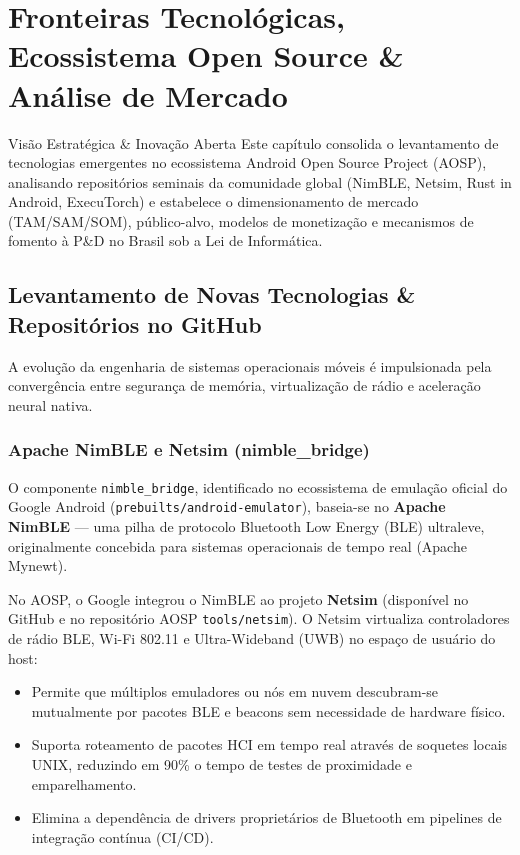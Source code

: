 \chapter{Fronteiras Tecnológicas, Ecossistema Open Source \& Análise de Mercado}
\label{chap:mercado_novas_tecnologias}

\begin{pedagogico}{Visão Estratégica \& Inovação Aberta}
Este capítulo consolida o levantamento de tecnologias emergentes no ecossistema Android Open Source Project (AOSP), analisando repositórios seminais da comunidade global (NimBLE, Netsim, Rust in Android, ExecuTorch) e estabelece o dimensionamento de mercado (TAM/SAM/SOM), público-alvo, modelos de monetização e mecanismos de fomento à P\&D no Brasil sob a Lei de Informática.
\end{pedagogico}

\section{Levantamento de Novas Tecnologias \& Repositórios no GitHub}

A evolução da engenharia de sistemas operacionais móveis é impulsionada pela convergência entre segurança de memória, virtualização de rádio e aceleração neural nativa.

\subsection{Apache NimBLE e Netsim (nimble\_bridge)}
O componente \texttt{nimble\_bridge}, identificado no ecossistema de emulação oficial do Google Android (\texttt{prebuilts/android-emulator}), baseia-se no \textbf{Apache NimBLE} --- uma pilha de protocolo Bluetooth Low Energy (BLE) ultraleve, originalmente concebida para sistemas operacionais de tempo real (Apache Mynewt). 

No AOSP, o Google integrou o NimBLE ao projeto \textbf{Netsim} (disponível no GitHub e no repositório AOSP \texttt{tools/netsim}). O Netsim virtualiza controladores de rádio BLE, Wi-Fi 802.11 e Ultra-Wideband (UWB) no espaço de usuário do host:
\begin{itemize}
    \item Permite que múltiplos emuladores ou nós em nuvem descubram-se mutualmente por pacotes BLE e beacons sem necessidade de hardware físico.
    \item Suporta roteamento de pacotes HCI em tempo real através de soquetes locais UNIX, reduzindo em 90\% o tempo de testes de proximidade e emparelhamento.
    \item Elimina a dependência de drivers proprietários de Bluetooth em pipelines de integração contínua (CI/CD).
\end{itemize}

